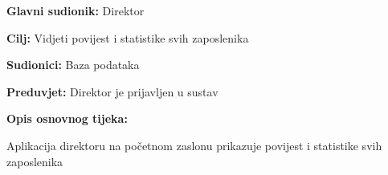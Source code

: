 					\noindent {}
					\begin{packed_item}
	
						\item \textbf{Glavni sudionik:} Direktor
						\item  \textbf{Cilj:} Vidjeti povijest i statistike svih zaposlenika
						\item  \textbf{Sudionici:} Baza podataka
						\item  \textbf{Preduvjet:} Direktor je prijavljen u sustav
						\item  \textbf{Opis osnovnog tijeka:}
						
						\item[] \begin{packed_enum}
	
							\item Aplikacija direktoru na početnom zaslonu prikazuje povijest i statistike svih zaposlenika

						\end{packed_enum}

					\end{packed_item}


